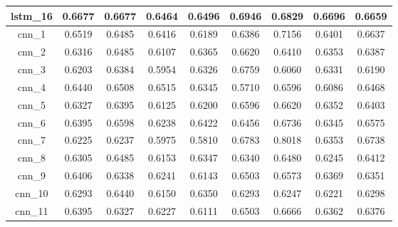 \begin{table}[p]
\begin{tabular} {|c|c|c|c|c|c|c|c|c| }
        lstm\_16 & 0.6677                        & 0.6677                         & 0.6464                      & 0.6496                  & 0.6946 & 0.6829 & 0.6696 & 0.6659 \\ \hline
        cnn\_1   & 0.6519                        & 0.6485                         & 0.6416                      & 0.6189                  & 0.6386 & 0.7156 & 0.6401 & 0.6637 \\ \hline
        cnn\_2   & 0.6316                        & 0.6485                         & 0.6107                      & 0.6365                  & 0.6620 & 0.6410 & 0.6353 & 0.6387 \\ \hline
        cnn\_3   & 0.6203                        & 0.6384                         & 0.5954                      & 0.6326                  & 0.6759 & 0.6060 & 0.6331 & 0.6190 \\ \hline
        cnn\_4   & 0.6440                        & 0.6508                         & 0.6515                      & 0.6345                  & 0.5710 & 0.6596 & 0.6086 & 0.6468 \\ \hline
        cnn\_5   & 0.6327                        & 0.6395                         & 0.6125                      & 0.6200                  & 0.6596 & 0.6620 & 0.6352 & 0.6403 \\ \hline
        cnn\_6   & 0.6395                        & 0.6598                         & 0.6238                      & 0.6422                  & 0.6456 & 0.6736 & 0.6345 & 0.6575 \\ \hline
        cnn\_7   & 0.6225                        & 0.6237                         & 0.5975                      & 0.5810                  & 0.6783 & 0.8018 & 0.6353 & 0.6738 \\ \hline
        cnn\_8   & 0.6305                        & 0.6485                         & 0.6153                      & 0.6347                  & 0.6340 & 0.6480 & 0.6245 & 0.6412 \\ \hline
        cnn\_9   & 0.6406                        & 0.6338                         & 0.6241                      & 0.6143                  & 0.6503 & 0.6573 & 0.6369 & 0.6351 \\ \hline
        cnn\_10  & 0.6293                        & 0.6440                         & 0.6150                      & 0.6350                  & 0.6293 & 0.6247 & 0.6221 & 0.6298 \\ \hline
        cnn\_11  & 0.6395                        & 0.6327                         & 0.6227                      & 0.6111                  & 0.6503 & 0.6666 & 0.6362 & 0.6376 \\ \hline
    \end{tabular}
\end{table}


